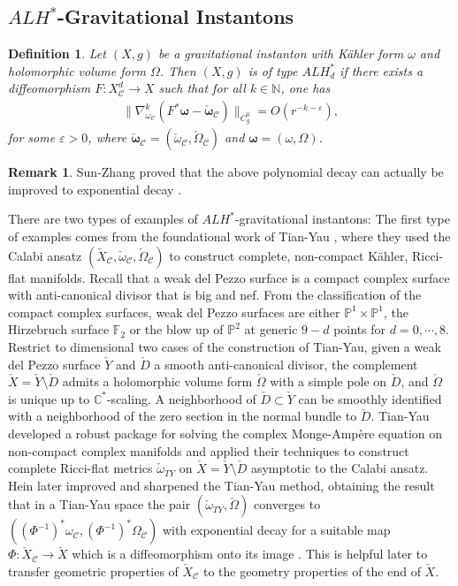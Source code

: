 \documentclass[11pt]{amsart}
\theoremstyle{plain}
\newtheorem{defn}[thm]{Definition}
\theoremstyle{definition}
\newtheorem{rk}[thm]{Remark}
\numberwithin{equation}{section}
\renewcommand{\epsilon}{\varepsilon}
\begin{document}
\subsection{$ALH^*$-Gravitational Instantons}\label{sec: ALH* gi}
  \begin{defn} Let $(X,g)$ be a gravitational instanton with K\"ahler form $\omega$ and holomorphic volume form $\Omega$. 
  	Then $(X,g)$ is of type $ALH_d^*$ if there exists a diffeomorphism $F:X^d_{\mathcal{C}}\rightarrow X$ such that for all $k\in \mathbb{N}$, one has 
  	  \begin{align*}
  	  	  \|\nabla^k_{{ \omega}_{\mathcal{C}}} (F^*\boldsymbol{\omega}-\boldsymbol{\check{\omega}}_{\mathcal{C}})\|_{C^0_g}=O(r^{-k-\epsilon}), 
  	  \end{align*} for some $\epsilon>0$, where $\boldsymbol{\check{\omega}}_{\mathcal{C}}=(\check{\omega}_{\mathcal{C}},\check{\Omega}_{\mathcal{C}})$ and $\boldsymbol{\omega}=(\omega,\Omega)$. 
  \end{defn}
 \begin{rk}
 	 Sun-Zhang proved that the above polynomial decay can actually be improved to exponential decay \cite{SZ}.
 \end{rk}
   There are two types of examples of $ALH^*$-gravitational instantons: 
   The first type of examples comes from the foundational work of Tian-Yau \cite{TY}, where they used the Calabi ansatz $(\check{X}_{\mathcal{C}},\check{\omega}_{\mathcal{C}},\check{\Omega}_{\mathcal{C}})$ to construct complete, non-compact K\"ahler, Ricci-flat manifolds. Recall that a weak del Pezzo surface is a compact complex surface with anti-canonical divisor that is big and nef. From the classification of the compact complex surfaces, weak del Pezzo surfaces are either $\mathbb{P}^1\times \mathbb{P}^1$, the Hirzebruch surface $\mathbb{F}_2$ or the blow up of $\mathbb{P}^2$ at generic $9-d$ points for $d=0,\cdots, 8$.  
   Restrict to dimensional two cases of the construction of Tian-Yau, given a weak del Pezzo surface $\check{Y}$ and $\check{D}$ a smooth anti-canonical divisor, the complement $\check{X}=\check{Y}\setminus \check{D}$ admits a holomorphic volume form $\check{\Omega}$ with a simple pole on $\check{D}$, and $\check{\Omega}$ is unique up to $\mathbb{C}^*$-scaling. A neighborhood of $\check{D}\subset \check{Y}$ can be smoothly identified with a neighborhood of the zero section in the normal bundle to $\check{D}$.  Tian-Yau developed a robust package for solving the complex Monge-Amp\`ere equation on non-compact complex manifolds and applied their techniques to construct complete Ricci-flat metrics $\check{\omega}_{TY}$ on $\check{X}=\check{Y}\setminus \check{D}$ asymptotic to the Calabi ansatz. Hein \cite{Hein} later improved and sharpened the Tian-Yau method, obtaining the result that in a Tian-Yau space the pair $(\check{\omega}_{TY},\check{\Omega})$ converges to $((\Phi^{-1})^*\omega_{\mathcal{C}},(\Phi^{-1})^*\Omega_{\mathcal{C}})$ with exponential decay for a suitable map $\Phi:\check{X}_{\mathcal{C}}\rightarrow \check{X}$ which is a diffeomorphism onto its image \cite{HSVZ}. This is helpful later to transfer geometric properties of $\check{X}_{\mathcal{C}}$ to the geometry properties of the end of $\check{X}$. 
   
\end{document}
